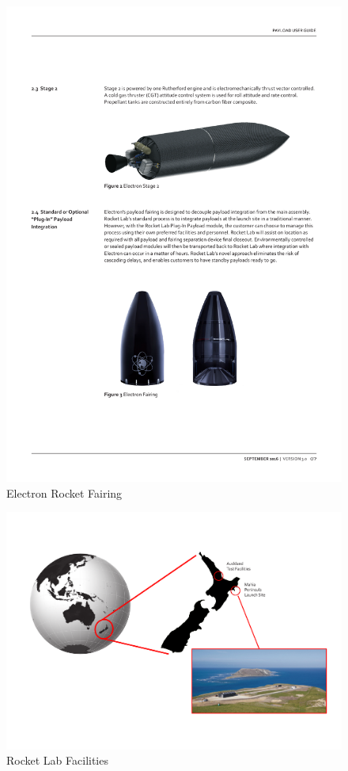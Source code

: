 \begin{figure}[h]
\centering 
\includegraphics[scale=0.7]{./sections/Constellation_Deployment/S2-Launcher/Images_S2/Picture_3_S2.pdf} 
\caption{Electron Rocket Fairing}
\end{figure}
\newline\newline
\begin{figure}[h!]
\includegraphics[scale=0.5]{./sections/Constellation_Deployment/S2-Launcher/Images_S2/Picture_4_S2.pdf} 
\caption{Rocket Lab Facilities}
\label{facilities}
\end{figure}